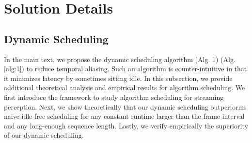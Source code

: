 \begin{table*}[!h]
\vspace{-1em}
\small
\centering
\caption{Streaming perception with joint detection, visual tracking, and forecasting on Tesla V100 (corresponding to
\ifstandalonesupplement
    Table 3
\else
    Table~\ref{tab:track}
\fi
in the main text). We find the similar conclusions that visual tracking with forecasting does not outperform association with forecasting in the single GPU case and achieves comparable performance in the infinite GPU case}
\label{tab:track-v100-aws}
\end{table*}


\clearpage

\section{Solution Details}
\label{app:solution-details}




\subsection{Dynamic Scheduling}
\label{app:dynamicschedule}

In the main text, we propose the dynamic scheduling algorithm \ifstandalonesupplement
    (Alg. 1)
\else
    (Alg. \ref{alg:1})
\fi
to reduce temporal aliasing. Such an algorithm is counter-intuitive in that it minimizes latency by sometimes sitting idle. In this subsection, we provide additional theoretical analysis and empirical results for algorithm scheduling. We first introduce the framework to study algorithm scheduling for streaming perception.
Next, we show theoretically that our dynamic scheduling outperforms naive idle-free scheduling for any constant runtime larger than the frame interval and any long-enough sequence length. Lastly, we verify empirically the superiority of our dynamic scheduling.

